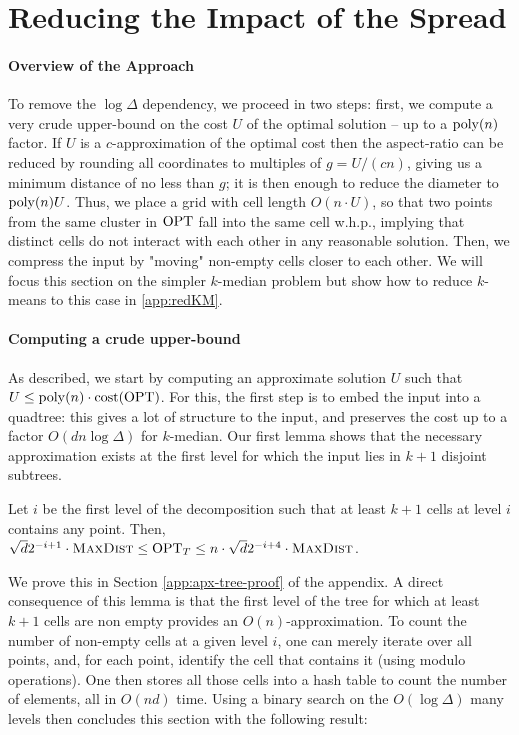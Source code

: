 \section{Reducing the Impact of the Spread}
\label{sec:logdelta}
\newcommand{\boxsize}{\textsc{MaxDist}}

\paragraph*{Overview of the Approach}

To remove the $\log\Delta$ dependency, we proceed in two steps: first, we compute a very crude upper-bound on the cost $U$ of the optimal solution -- up to
a $\operatorname{poly}(n)$ factor.  If $U$ is a $c$-approximation of the optimal cost then the aspect-ratio can be reduced by rounding all coordinates to multiples of $g
= U/(cn)$, giving us a minimum distance of no less than $g$; it is then enough to reduce the diameter to $\operatorname{poly}(n) U$.  Thus, we place a grid with cell length
$O(n \cdot U)$, so that two points from the same cluster in $\text{OPT}$ fall into the same cell w.h.p., implying that distinct cells do not interact with each other
in any reasonable solution.  Then, we compress the input by "moving" non-empty cells closer to each other. We will focus this section on the simpler $k$-median
problem but show how to reduce $k$-means to this case in \cref{app:redKM}.

\paragraph*{Computing a crude upper-bound}

As described, we start by computing an approximate solution $U$ such that $U \leq \operatorname{poly}(n) \cdot \operatorname{cost}(\text{OPT})$. For this, the first step is to embed the input
into a quadtree: this gives a lot of structure to the input, and preserves the cost up to a factor $O(d n \log \Delta)$ for $k$-median.  Our first lemma shows
that the necessary approximation exists at the first level for which the input lies in $k+1$ disjoint subtrees. 

\begin{lemma}\label{lem:apxTree}
Let $i$ be the first level of the decomposition such that at least $k+1$ cells at level $i$ contains any point. Then, $\sqrt{d}2^{-i+1} \cdot \boxsize \leq
\opt_T \leq n \cdot \sqrt{d}2^{-i+4} \cdot \boxsize$.
\end{lemma}

We prove this in Section \ref{app:apx-tree-proof} of the appendix. A direct consequence of this lemma is that the first level of the tree for which at least
$k+1$ cells are non empty provides an $O(n)$-approximation. To count the number of non-empty cells at a given level $i$, one can merely iterate over all points,
and, for each point, identify the cell that contains it (using modulo operations). One then stores all those cells into a hash table to count the number of
elements, all in $O(nd)$ time.  Using a binary search on the $O(\log \Delta)$ many levels then concludes this section with the following result:

